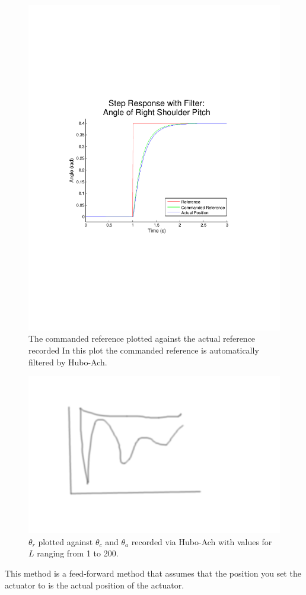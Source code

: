 \begin{figure}[thpb]
  \centering
\includegraphics[width=0.8\columnwidth]{./examples/pix/RSP-Zp4-step-filter-crop.pdf}
  \caption{The commanded reference plotted against the actual reference recorded  In this plot the commanded reference is automatically filtered by Hubo-Ach.}
  \label{fig:singleJointStepFiltered}
\end{figure}

\begin{figure}[thpb]
  \centering
\includegraphics[width=0.8\columnwidth]{./pix/tmp.png}
  \caption{$\theta_r$ plotted against $\theta_c$ and $\theta_a$ recorded via Hubo-Ach with values for $L$ ranging from 1 to 200.}
  \label{fig:singleJointStepFilteredLtest}
\end{figure}

This method is a feed-forward method that assumes that the position you set the actuator to is the actual position of the actuator.
